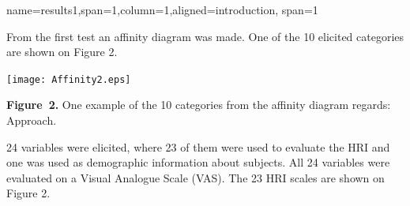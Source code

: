 \documentclass[paperwidth=118cm,paperheight=84cm,landscape,fontscale=0.2941]{baposter}
\begin{document}
\begin{poster}
{%


}


{name=results1,span=1,column=1,aligned=introduction, span=1}
{\parskip 5pt 
From the first test an affinity diagram was made. One of the 10 elicited categories are shown on Figure 2.
\vspace{-10pt}  
\begin{center}
	\texttt{[image: Affinity2.eps]}
	
	\textbf{Figure~2. }\footnotesize{One example of the 10 categories from the affinity diagram regards: Approach.}
\end{center}
\vspace{-10pt}  
24 variables were elicited, where 23 of them were used to evaluate the HRI and one was used as demographic information about subjects. All 24 variables were evaluated on a Visual Analogue Scale (VAS). The 23 HRI scales are shown on Figure 2.
  
}
\end{poster}
\end{document}
